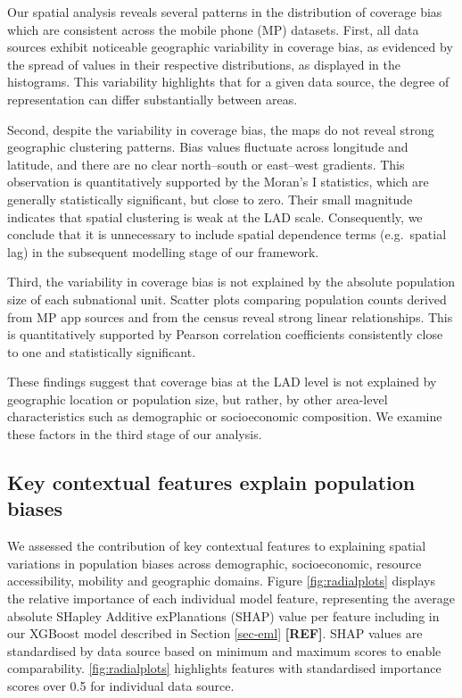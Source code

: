 \documentclass[]{rsos}%
\begin{document}
Our spatial analysis reveals several patterns in the distribution of
coverage bias which are consistent across the mobile phone (MP)
datasets. First, all data sources exhibit noticeable geographic
variability in coverage bias, as evidenced by the spread of values in
their respective distributions, as displayed in the histograms. This
variability highlights that for a given data source, the degree of
representation can differ substantially between areas.

Second, despite the variability in coverage bias, the maps do not reveal
strong geographic clustering patterns. Bias values fluctuate across
longitude and latitude, and there are no clear north--south or east--west
gradients. This observation is quantitatively supported by the Moran's I
statistics, which are generally statistically significant, but close to
zero. Their small magnitude indicates that spatial clustering is weak at
the LAD scale. Consequently, we conclude that it is unnecessary to
include spatial dependence terms (e.g.~spatial lag) in the subsequent
modelling stage of our framework.

Third, the variability in coverage bias is not explained by the absolute
population size of each subnational unit. Scatter plots comparing
population counts derived from MP app sources and from the census reveal
strong linear relationships. This is quantitatively supported by Pearson
correlation coefficients consistently close to one and statistically
significant.

These findings suggest that coverage bias at the LAD level is not
explained by geographic location or population size, but rather, by
other area-level characteristics such as demographic or socioeconomic
composition. We examine these factors in the third stage of our analysis.

\subsection{Key contextual features explain population biases}\label{key-contextual-features-explain-population-biases}

We assessed the contribution of key contextual features to explaining spatial variations in population biases across demographic, socioeconomic, resource accessibility, mobility and geographic domains. Figure \ref{fig:radialplots} displays the relative importance of each individual model feature, representing the average absolute SHapley Additive exPlanations (SHAP) value per feature including in our XGBoost model described in Section \ref{sec-eml} \textbf{{[}REF{]}}. SHAP values are standardised by data source based on minimum and maximum scores to enable comparability. \ref{fig:radialplots} highlights features with standardised importance scores over 0.5 for individual data source.
\end{document}
